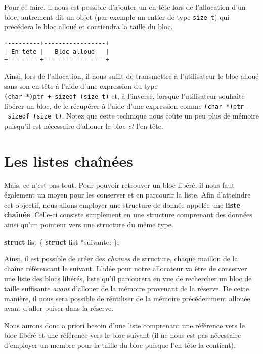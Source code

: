 \documentclass[]{article}
\newenvironment{Shaded}{}{}
\newcommand{\KeywordTok}[1]{\textcolor[rgb]{0.00,0.44,0.13}{\textbf{{#1}}}}
\newcommand{\NormalTok}[1]{{#1}}
\begin{document}
Pour ce faire, il nous est possible d'ajouter un en-tête lors de
l'allocation d'un bloc, autrement dit un objet (par exemple un entier de
type \texttt{size\_t}) qui précédera le bloc alloué et contiendra la
taille du bloc.

\begin{verbatim}
+---------+-----------------+
| En-tête |   Bloc alloué   |
+---------+-----------------+
\end{verbatim}

Ainsi, lors de l'allocation, il nous suffit de transmettre à
l'utilisateur le bloc alloué sans son en-tête à l'aide d'une expression
du type \texttt{(char\ *)ptr\ +\ sizeof\ (size\_t)} et, à l'inverse,
lorsque l'utilisateur souhaite libérer un bloc, de le récupérer à l'aide
d'une expression comme \texttt{(char\ *)ptr\ -\ sizeof\ (size\_t)}.
Notez que cette technique nous coûte un peu plus de mémoire puisqu'il
est nécessaire d'allouer le bloc \emph{et} l'en-tête.

\section{Les listes chaînées}\label{les-listes-chauxeenuxe9es}

Mais, ce n'est pas tout. Pour pouvoir retrouver un bloc libéré, il nous
faut également un moyen pour les conserver et en parcourir la liste.
Afin d'atteindre cet objectif, nous allons employer une structure de
donnée appelée une \textbf{liste chaînée}. Celle-ci consiste simplement
en une structure comprenant des données ainsi qu'un pointeur vers une
structure du même type.

\begin{Shaded}
\begin{Highlighting}[]
\KeywordTok{struct} \NormalTok{list}
\NormalTok{\{}
    \KeywordTok{struct} \NormalTok{list *suivante;}
\NormalTok{\};}
\end{Highlighting}
\end{Shaded}

Ainsi, il est possible de créer des \emph{chaines} de structure, chaque
maillon de la chaîne référencant le suivant. L'idée pour notre
allocateur va être de conserver une liste des blocs libérés, liste qu'il
parcourera en vue de rechercher un bloc de taille suffisante
\emph{avant} d'allouer de la mémoire provenant de la réserve. De cette
manière, il nous sera possible de réutiliser de la mémoire précédemment
allouée avant d'aller puiser dans la réserve.

Nous aurons donc a priori besoin d'une liste comprenant une référence
vers le bloc libéré et une référence vers le bloc suivant (il ne nous
est pas nécessaire d'employer un membre pour la taille du bloc puisque
l'en-tête la contient).
\end{document}
